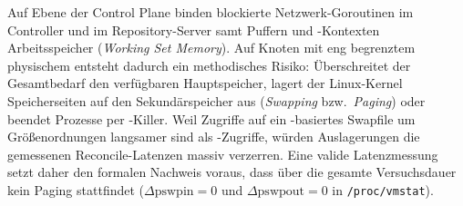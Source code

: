 Auf Ebene der Control Plane binden blockierte Netzwerk-Goroutinen im Controller und im Repository-Server samt Puffern und -Kontexten Arbeitsspeicher (\textit{Working Set Memory}). Auf Knoten mit eng begrenztem physischem  entsteht dadurch ein methodisches Risiko: Überschreitet der Gesamtbedarf den verfügbaren Hauptspeicher, lagert der Linux-Kernel Speicherseiten auf den Sekundärspeicher aus (\textit{Swapping} bzw.\ \textit{Paging}) oder beendet Prozesse per -Killer.\autocite[Abschn.~7.2, S.~305--309]{gregg_systems_2020} Weil Zugriffe auf ein -basiertes Swapfile um Größenordnungen langsamer sind als -Zugriffe, würden Auslagerungen die gemessenen Reconcile-Latenzen massiv verzerren. Eine valide Latenzmessung setzt daher den formalen Nachweis voraus, dass über die gesamte Versuchsdauer kein Paging stattfindet ($\Delta \text{pswpin} = 0$ und $\Delta \text{pswpout} = 0$ in \texttt{/proc/vmstat}).\autocite{kernel_vmstat_2026}
